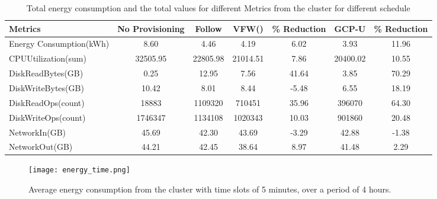 \documentclass[10pt,conference,compsocconf,letterpaper]{IEEEtran}
\begin{document}
\begin{table*}[!t]
  \centering
  \caption{Total energy consumption and the total values for different Metrics from the cluster for different schedule}
    \begin{tabular}{l|c|c|c|c|c|c}
    \hline\hline
    Metrics & No Provisioning & Follow  & VFW() &  \% Reduction & GCP-U &  \% Reduction \\
    \hline
    Energy Consumption(kWh) &   8.60    &   4.46    &  4.19     &    6.02   & 3.93 & 11.96 \\
    CPUUtilization(sum) &   32505.95    &   22805.98    &  21014.51     &     7.86  & 20400.02& 10.55 \\
    DiskReadBytes(GB) &   0.25    &   12.95    &   7.56    &     41.64  & 3.85 & 70.29 \\
    DiskWriteBytes(GB) &  10.42     &   8.01    &   8.44    &    -5.48   & 6.55 & 18.19\\
    DiskReadOps(count) &  18883     &   1109320    &   710451    &    35.96 & 396070 & 64.30   \\
    DiskWriteOps(count) &  1746347     &   1134108    &   1020343    &    10.03 & 901860 &  20.48  \\
    NetworkIn(GB) &  45.69     &   42.30    &   43.69    &    -3.29  & 42.88 & -1.38 \\
    NetworkOut(GB) &  44.21     &  42.45     &   38.64    &    8.97  & 41.48 &  2.29\\
    \hline
    \end{tabular}\label{table:reduction}\end{table*}












\begin{figure}[!t]
\begin{center}
\texttt{[image: energy\_time.png]}
\caption{Average energy consumption from the cluster with time slots of 5 minutes, over a period of 4 hours.}
\label{fig:energyconsumption}
\end{center}
\end{figure}
\end{document}
